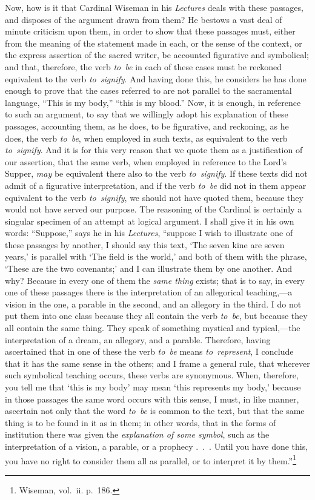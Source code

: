 \documentclass[
]{book}
\begin{document}
Now, how is it that Cardinal Wiseman in his \emph{Lectures} deals with these passages, and disposes of the argument drawn from them? He bestows a vast deal of minute criticism upon them, in order to show that these passages must, either from the meaning of the statement made in each, or the sense of the context, or the express assertion of the sacred writer, be accounted figurative and symbolical; and that, therefore, the verb \emph{to~be} in each of these cases must be reckoned equivalent to the verb \emph{to~signify}. And having done this, he considers he has done enough to prove that the cases referred to are not parallel to the sacramental language, ``This is my body,'' ``this is my blood.'' Now, it is enough, in reference to such an argument, to say that we willingly adopt his explanation of these passages, accounting them, as he does, to be figurative, and reckoning, as he does, the verb \emph{to~be}, when employed in such texts, as equivalent to the verb \emph{to~signify}. And it is for this very reason that we quote them as a justification of our assertion, that the same verb, when employed in reference to the Lord's Supper, \emph{may} be equivalent there also to the verb \emph{to~signify}. If these texts did not admit of a figurative interpretation, and if the verb \emph{to~be} did not in them appear equivalent to the verb \emph{to~signify}, we should not have quoted them, because they would not have served our purpose. The reasoning of the Cardinal is certainly a singular specimen of an attempt at logical argument. I shall give it in his own words: ``Suppose,'' says he in his \emph{Lectures}, ``suppose I wish to illustrate one of these passages by another, I should say this text, `The seven kine are seven years,' is parallel with `The field is the world,' and both of them with the phrase, `These are the two covenants;' and I can illustrate them by one another. And why? Because in every one of them the \emph{same thing} exists; that is to say, in every one of these passages there is the interpretation of an allegorical teaching,---a vision in the one, a parable in the second, and an allegory in the third. I do not put them into one class because they all contain the verb \emph{to~be}, but because they all contain the same thing. They speak of something mystical and typical,---the interpretation of a dream, an allegory, and a parable. Therefore, having ascertained that in one of these the verb \emph{to~be} means \emph{to~represent}, I conclude that it has the same sense in the others; and I frame a general rule, that wherever such symbolical teaching occurs, these verbs are synonymous. When, therefore, you tell me that `this is my body' may mean `this represents my body,' because in those passages the same word occurs with this sense, I must, in like manner, ascertain not only that the word \emph{to~be} is common to the text, but that the same thing is to be found in it as in them; in other words, that in the forms of institution there was given the \emph{explanation of some symbol}, such as the interpretation of a vision, a parable, or a prophecy .~.~. Until you have done this, you have no right to consider them all as parallel, or to interpret it by them.''\footnote{Wiseman, vol.~ii. p.~186.}
\end{document}
